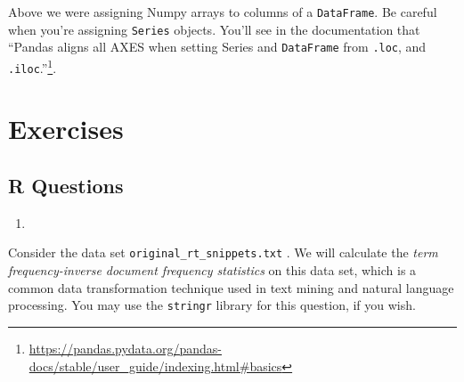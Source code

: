 \documentclass[
  12pt,
  krantz2]{krantz}
\providecommand{\tightlist}{%
  \setlength{\itemsep}{0pt}\setlength{\parskip}{0pt}}
\renewcommand{\href}[2]{#2\footnote{\url{#1}}}
\newenvironment{rmd-caution}{\begin{lrbox}{\rmdbox}
  \minipage[c]{\dimexpr \textwidth-2\fboxrule-\wd\excl-\columnsep}
    \vspace*{\columnsep}}%
{\vspace*{\columnsep}\endminipage\end{lrbox}%
  {\par\color{yellow}\fboxsep=0pt
    \fbox{\usebox\excl\usebox\rmdbox\hspace{\columnsep}}\par}}
\begin{document}
\begin{rmd-caution}
Above we were assigning Numpy arrays to columns of a \texttt{DataFrame}. Be careful when you're assigning \texttt{Series} objects. You'll see in the documentation that \href{https://pandas.pydata.org/pandas-docs/stable/user_guide/indexing.html\#basics}{``Pandas aligns all AXES when setting Series and \texttt{DataFrame} from \texttt{.loc}, and \texttt{.iloc}.''}.

\end{rmd-caution}

\hypertarget{exercises-6}{%
\section{Exercises}\label{exercises-6}}

\hypertarget{r-questions-6}{%
\subsection{R Questions}\label{r-questions-6}}

\begin{enumerate}
\def\labelenumi{\arabic{enumi}.}
\tightlist
\item
\end{enumerate}

Consider the data set \texttt{original\_rt\_snippets.txt} \citep{SocherEtAl2013:RNTN}. We will calculate the \emph{term frequency-inverse document frequency statistics} \citep{Jones72astatistical} on this data set, which is a common data transformation technique used in text mining and natural language processing. You may use the \texttt{stringr} library for this question, if you wish.
\end{document}
